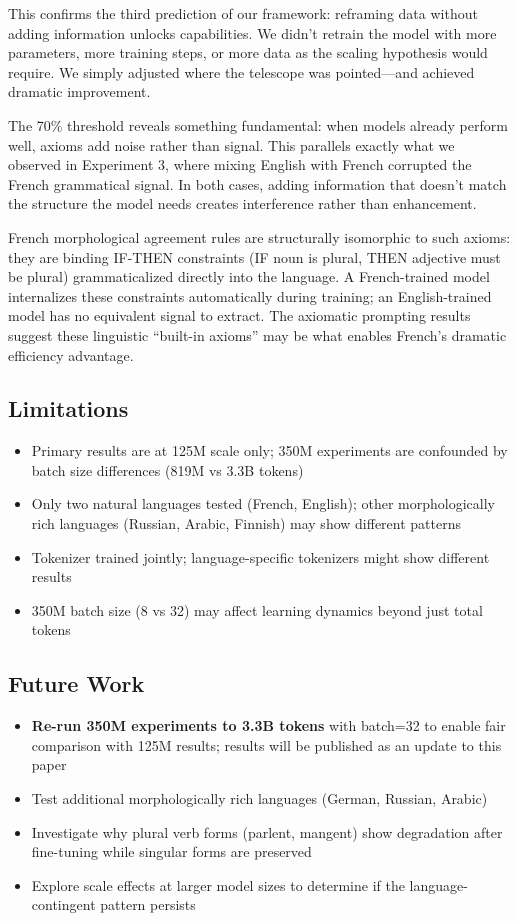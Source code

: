 \documentclass[11pt,a4paper]{article}
\begin{document}
This confirms the third prediction of our framework: reframing data without adding information unlocks capabilities. We didn't retrain the model with more parameters, more training steps, or more data as the scaling hypothesis would require. We simply adjusted where the telescope was pointed---and achieved dramatic improvement.

The 70\% threshold reveals something fundamental: when models already perform well, axioms add noise rather than signal. This parallels exactly what we observed in Experiment 3, where mixing English with French corrupted the French grammatical signal. In both cases, adding information that doesn't match the structure the model needs creates interference rather than enhancement.

French morphological agreement rules are structurally isomorphic to such axioms: they are binding IF-THEN constraints (IF noun is plural, THEN adjective must be plural) grammaticalized directly into the language. A French-trained model internalizes these constraints automatically during training; an English-trained model has no equivalent signal to extract. The axiomatic prompting results suggest these linguistic ``built-in axioms'' may be what enables French's dramatic efficiency advantage.

\subsection{Limitations}

\begin{itemize}
    \item Primary results are at 125M scale only; 350M experiments are confounded by batch size differences (819M vs 3.3B tokens)
    \item Only two natural languages tested (French, English); other morphologically rich languages (Russian, Arabic, Finnish) may show different patterns
    \item Tokenizer trained jointly; language-specific tokenizers might show different results
    \item 350M batch size (8 vs 32) may affect learning dynamics beyond just total tokens
\end{itemize}

\subsection{Future Work}

\begin{itemize}
    \item \textbf{Re-run 350M experiments to 3.3B tokens} with batch=32 to enable fair comparison with 125M results; results will be published as an update to this paper
    \item Test additional morphologically rich languages (German, Russian, Arabic)
    \item Investigate why plural verb forms (parlent, mangent) show degradation after fine-tuning while singular forms are preserved
    \item Explore scale effects at larger model sizes to determine if the language-contingent pattern persists
\end{itemize}
\end{document}
